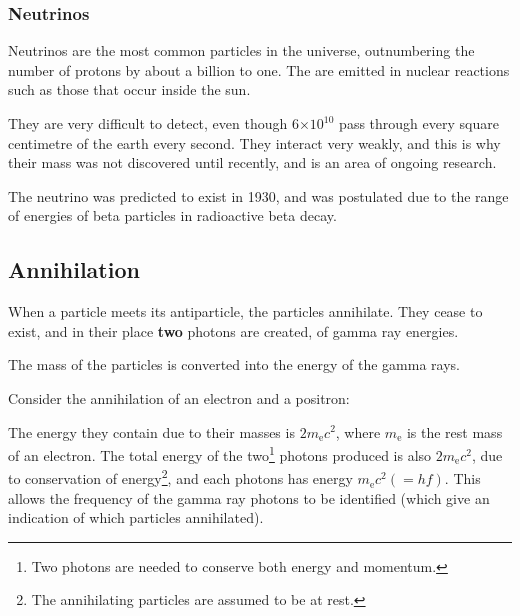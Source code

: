 \documentclass[a4paper,12pt]{article}
\providecommand{\e}[1]{\ensuremath{\times 10^{#1}}}
\begin{document}
\subsubsection{Neutrinos}

Neutrinos are the most common particles in the universe, outnumbering the number of protons by about a billion to one.  The are emitted in nuclear reactions such as those that occur inside the sun.

They are very difficult to detect, even though 6\e{10} pass through every square centimetre of the earth every second.  They interact very weakly, and this is why their mass was not discovered until recently, and is an area of ongoing research.

The neutrino was predicted to exist in 1930, and was postulated due to the range of energies of beta particles in radioactive beta decay.

\subsection{Annihilation}

When a particle meets its antiparticle, the particles annihilate.  They cease to exist, and in their place {\bf two} photons are created, of gamma ray energies.

The mass of the particles is converted into the energy of the gamma rays.

\noindent Consider the annihilation of an electron and a positron:\\


The energy they contain due to their masses is $2m_{\mathrm{e}}c^{2}$, where $m_{\mathrm{e}}$ is the rest mass of an electron.  The total energy of the two\footnote{Two photons are needed to conserve both energy and momentum.} photons produced is also $2m_{\mathrm{e}}c^{2}$, due to conservation of energy\footnote{The annihilating particles are assumed to be at rest.}, and each photons has energy $m_{\mathrm{e}}c^{2}(=hf)$.  This allows the frequency of the gamma ray photons to be identified (which give an indication of which particles annihilated).
\end{document}
